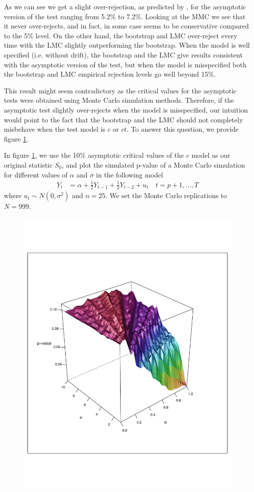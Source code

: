 \documentclass[11pt]{article}\usepackage[]{graphicx}\usepackage[]{color}
\begin{document}
As we can see we get a slight over-rejection, as predicted by \cite{david_a._dickey_determining_1987},  for the asymptotic version of the test ranging from 5.2\% to 7.2\%. Looking at the MMC we see that it never over-rejects, and in fact, in some case seems to be conservative compared to the 5\% level. On the other hand, the bootstrap and LMC over-reject every time with the LMC slightly outperforming the bootstrap. When the model is well specified (i.e. without drift), the bootstrap and the LMC give results consistent with the asymptotic version of the test, but when the model is misspecified both the bootstrap and LMC empirical rejection levels go well beyond 15\%.

This result might seem contradictory as the critical values for the asymptotic tests were obtained using Monte Carlo simulation methods. Therefore, if the asymptotic test slightly over-rejects when the model is misspecified, our intuition would point to the fact that the bootstrap and the LMC should not completely misbehave when the test model is $c$ or $ct$. To answer this question, we provide figure \ref{fig:c-drift}.

In figure \ref{fig:c-drift}, we use the 10\% asymptotic critical values of the $c$ model as our original statistic $S_0$, and plot the simulated p-value of a Monte Carlo simulation for different values of $\alpha$ and $\sigma$ in the following model
\begin{align}
	Y_t & = \alpha + \frac{1}{2}Y_{t-1} + \frac{1}{2}Y_{t-2} + u_t \quad t = p + 1, ... , T
\end{align}
where $u_t \sim N(0,\sigma^2)$ and $n=25$. We set the Monte Carlo replications to $N=999$.

\begin{figure}[H]
	\centering
	\includegraphics[width=0.7\linewidth]{fig/c-drift}
	\caption{}
	\label{fig:c-drift}
\end{figure}
\end{document}

